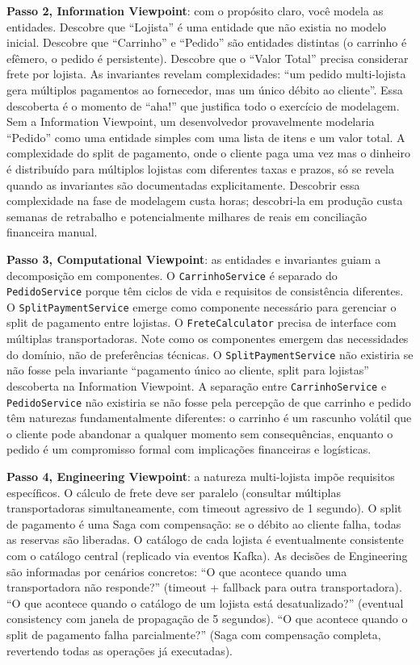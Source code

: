 \textbf{Passo 2, Information Viewpoint}: com o propósito claro, você modela
as entidades. Descobre que ``Lojista'' é uma entidade que não existia no modelo
inicial. Descobre que ``Carrinho'' e ``Pedido'' são entidades distintas (o
carrinho é efêmero, o pedido é persistente). Descobre que o ``Valor Total''
precisa considerar frete por lojista. As invariantes revelam complexidades:
``um pedido multi-lojista gera múltiplos pagamentos ao fornecedor, mas um
único débito ao cliente''. Essa descoberta é o momento de ``aha!'' que justifica
todo o exercício de modelagem. Sem a Information Viewpoint, um desenvolvedor
provavelmente modelaria ``Pedido'' como uma entidade simples com uma lista de
itens e um valor total. A complexidade do split de pagamento, onde o cliente
paga uma vez mas o dinheiro é distribuído para múltiplos lojistas com diferentes
taxas e prazos, só se revela quando as invariantes são documentadas
explicitamente. Descobrir essa complexidade na fase de modelagem custa horas;
descobri-la em produção custa semanas de retrabalho e potencialmente milhares de
reais em conciliação financeira manual.

\textbf{Passo 3, Computational Viewpoint}: as entidades e invariantes guiam
a decomposição em componentes. O \texttt{CarrinhoService} é separado do
\texttt{PedidoService} porque têm ciclos de vida e requisitos de consistência
diferentes. O \texttt{SplitPaymentService} emerge como componente necessário
para gerenciar o split de pagamento entre lojistas. O \texttt{FreteCalculator}
precisa de interface com múltiplas transportadoras. Note como os componentes
emergem das necessidades do domínio, não de preferências técnicas. O
\texttt{SplitPaymentService} não existiria se não fosse pela invariante
``pagamento único ao cliente, split para lojistas'' descoberta na Information
Viewpoint. A separação entre \texttt{CarrinhoService} e \texttt{PedidoService}
não existiria se não fosse pela percepção de que carrinho e pedido têm naturezas
fundamentalmente diferentes: o carrinho é um rascunho volátil que o cliente
pode abandonar a qualquer momento sem consequências, enquanto o pedido é um
compromisso formal com implicações financeiras e logísticas.

\textbf{Passo 4, Engineering Viewpoint}: a natureza multi-lojista impõe
requisitos específicos. O cálculo de frete deve ser paralelo (consultar
múltiplas transportadoras simultaneamente, com timeout agressivo de 1 segundo).
O split de pagamento é uma Saga com compensação: se o débito ao cliente
falha, todas as reservas são liberadas. O catálogo de cada lojista é
eventualmente consistente com o catálogo central (replicado via eventos Kafka).
As decisões de Engineering são informadas por cenários concretos: ``O que
acontece quando uma transportadora não responde?'' (timeout + fallback para outra
transportadora). ``O que acontece quando o catálogo de um lojista está
desatualizado?'' (eventual consistency com janela de propagação de 5 segundos).
``O que acontece quando o split de pagamento falha parcialmente?'' (Saga com
compensação completa, revertendo todas as operações já executadas).

